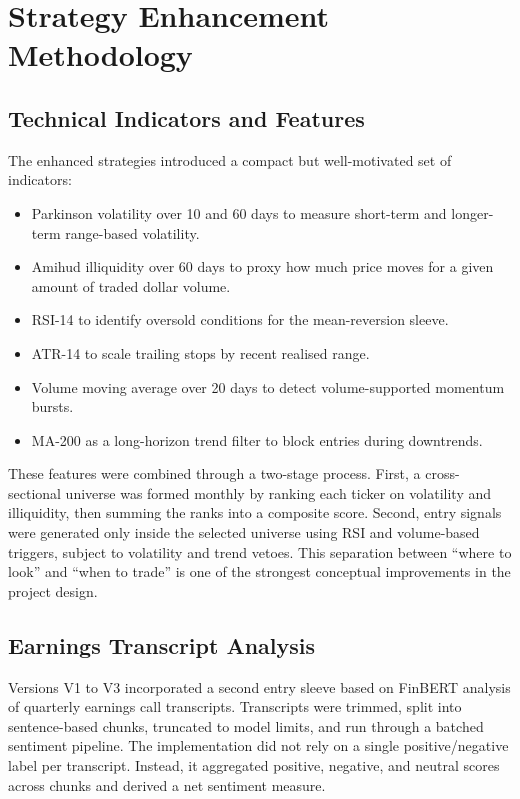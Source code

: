 \documentclass[11pt,twoside,a4paper]{article}
\begin{document}
\section{Strategy Enhancement Methodology}
\subsection*{Technical Indicators and Features}
The enhanced strategies introduced a compact but well-motivated set of indicators:
\begin{itemize}
    \item Parkinson volatility over 10 and 60 days to measure short-term and longer-term range-based volatility.
    \item Amihud illiquidity over 60 days to proxy how much price moves for a given amount of traded dollar volume.
    \item RSI-14 to identify oversold conditions for the mean-reversion sleeve.
    \item ATR-14 to scale trailing stops by recent realised range.
    \item Volume moving average over 20 days to detect volume-supported momentum bursts.
    \item MA-200 as a long-horizon trend filter to block entries during downtrends.
\end{itemize}

These features were combined through a two-stage process. First, a cross-sectional universe was formed monthly by ranking each ticker on volatility and illiquidity, then summing the ranks into a composite score. Second, entry signals were generated only inside the selected universe using RSI and volume-based triggers, subject to volatility and trend vetoes. This separation between ``where to look'' and ``when to trade'' is one of the strongest conceptual improvements in the project design.

\subsection*{Earnings Transcript Analysis}
Versions V1 to V3 incorporated a second entry sleeve based on FinBERT analysis of quarterly earnings call transcripts. Transcripts were trimmed, split into sentence-based chunks, truncated to model limits, and run through a batched sentiment pipeline. The implementation did not rely on a single positive/negative label per transcript. Instead, it aggregated positive, negative, and neutral scores across chunks and derived a net sentiment measure.
\end{document}
